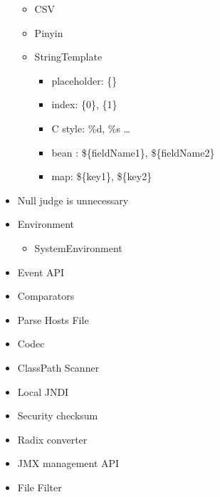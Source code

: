 \documentclass[
]{book}
\providecommand{\tightlist}{%
  \setlength{\itemsep}{0pt}\setlength{\parskip}{0pt}}
\begin{document}
\begin{itemize}
  \begin{itemize}
  \tightlist
  \item
    CSV
  \item
    Pinyin
  \item
    StringTemplate

    \begin{itemize}
    \tightlist
    \item
      placeholder: \{\}
    \item
      index: \{0\}, \{1\}
    \item
      C style: \%d, \%s \ldots{}
    \item
      bean : \$\{fieldName1\}, \$\{fieldName2\}
    \item
      map: \$\{key1\}, \$\{key2\}
    \end{itemize}
  \end{itemize}
\item
  Null judge is unnecessary
\item
  Environment

  \begin{itemize}
  \tightlist
  \item
    SystemEnvironment
  \end{itemize}
\item
  Event API\\
\item
  Comparators
\item
  Parse Hosts File
\item
  Codec
\item
  ClassPath Scanner
\item
  Local JNDI
\item
  Security checksum
\item
  Radix converter
\item
  JMX management API
\item
  File Filter


\end{itemize}
\end{document}
